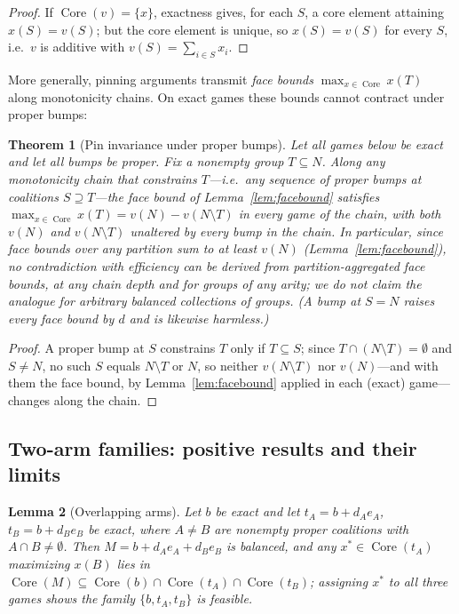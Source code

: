 \documentclass[11pt]{article}
\newtheorem{theorem}{Theorem}[section]
\newtheorem{lemma}[theorem]{Lemma}
\newcommand{\core}{\operatorname{Core}}
\begin{document}
\begin{proof}
If $\core(v)=\{x\}$, exactness gives, for each $S$, a core element attaining
$x(S)=v(S)$; but the core element is unique, so $x(S)=v(S)$ for every $S$,
i.e.\ $v$ is additive with $v(S)=\sum_{i\in S}x_i$.
\end{proof}

More generally, pinning arguments transmit \emph{face bounds}
$\max_{x\in\core}x(T)$ along monotonicity chains. On exact games these
bounds cannot contract under proper bumps:

\begin{theorem}[Pin invariance under proper bumps]\label{thm:pin}
Let all games below be exact and let all bumps be proper. Fix a nonempty
group $T\subseteq N$. Along any monotonicity chain that constrains
$T$---i.e.\ any sequence of proper bumps at coalitions $S\supseteq T$---the
face bound of Lemma~\ref{lem:facebound} satisfies
$\max_{x\in\core}x(T)=v(N)-v(N\setminus T)$ in every game of the chain, with
both $v(N)$ and $v(N\setminus T)$ unaltered by every bump in the chain. In
particular, since face bounds over any partition sum to at least $v(N)$
(Lemma~\ref{lem:facebound}), no contradiction with efficiency can be derived
from partition-aggregated face bounds, at any chain depth and for groups of
any arity; we do not claim the analogue for arbitrary balanced collections
of groups. (A bump at $S=N$ raises every face bound by $d$ and is likewise
harmless.)
\end{theorem}

\begin{proof}
A proper bump at $S$ constrains $T$ only if $T\subseteq S$; since
$T\cap(N\setminus T)=\emptyset$ and $S\neq N$, no such $S$ equals
$N\setminus T$ or $N$, so neither $v(N\setminus T)$ nor $v(N)$---and with
them the face bound, by Lemma~\ref{lem:facebound} applied in each (exact)
game---changes along the chain.
\end{proof}

\subsection{Two-arm families: positive results and their limits}

\begin{lemma}[Overlapping arms]\label{lem:vescape}
Let $b$ be exact and let $t_A=b+d_A e_A$, $t_B=b+d_B e_B$ be exact, where
$A\neq B$ are nonempty proper coalitions with $A\cap B\neq\emptyset$. Then
$M=b+d_Ae_A+d_Be_B$ is balanced, and any $x^*\in\core(t_A)$ maximizing
$x(B)$ lies in
$\core(M)\subseteq\core(b)\cap\core(t_A)\cap\core(t_B)$; assigning $x^*$ to
all three games shows the family $\{b,t_A,t_B\}$ is feasible.
\end{lemma}
\end{document}
